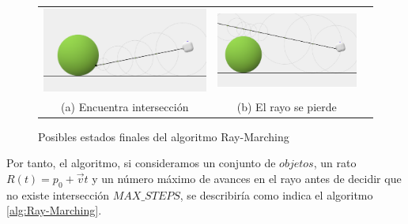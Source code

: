 \begin{figure}[ht]
    \centering
    \begin{tabular}{ccc}
      \includegraphics[scale=0.2]{img/C8/ray-marching-final.png} &     \includegraphics[scale=0.2]{img/C8/ray-marching-miss.png} \\
    (a) Encuentra intersección & (b) El rayo se pierde \\[6pt]
    \end{tabular}
    \caption{Posibles estados finales del algoritmo Ray-Marching}
    \label{fig:finales}
\end{figure}

Por tanto, el algoritmo, si consideramos un conjunto de $objetos$, un rato $R(t)=p_0 + \vec v t$ y un número máximo de avances en el rayo antes de decidir que no existe intersección $MAX\_STEPS$, se describiría como indica el algoritmo \ref{alg:Ray-Marching}.

